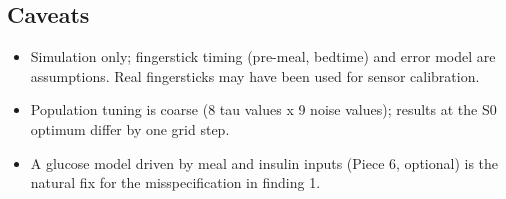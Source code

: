 \documentclass[11pt,a4paper]{article}
\providecommand{\tightlist}{\setlength{\itemsep}{0pt}\setlength{\parskip}{0pt}}
\begin{document}
\hypertarget{caveats}{%
\subsection{Caveats}\label{caveats}}

\begin{itemize}
\tightlist
\item
  Simulation only; fingerstick timing (pre-meal, bedtime) and error
  model are assumptions. Real fingersticks may have been used for sensor
  calibration.
\item
  Population tuning is coarse (8 tau values x 9 noise values); results
  at the S0 optimum differ by one grid step.
\item
  A glucose model driven by meal and insulin inputs (Piece 6, optional)
  is the natural fix for the misspecification in finding 1.
\end{itemize}
\end{document}
